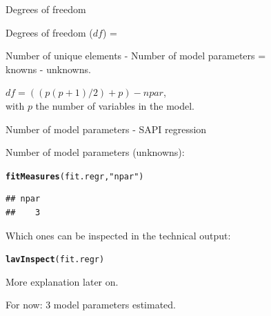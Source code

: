 \documentclass[10pt]{beamer}\usepackage[]{graphicx}\usepackage[]{xcolor}
\makeatletter
\newcommand{\hlstr}[1]{\textcolor[rgb]{0.192,0.494,0.8}{#1}}%
\newcommand{\hlstd}[1]{\textcolor[rgb]{0.345,0.345,0.345}{#1}}%
\newcommand{\hlkwd}[1]{\textcolor[rgb]{0.737,0.353,0.396}{\textbf{#1}}}%
\newenvironment{kframe}{%
 \def\at@end@of@kframe{}%
 \ifinner\ifhmode%
  \def\at@end@of@kframe{\end{minipage}}%
  \begin{minipage}{\columnwidth}%
 \fi\fi%
 \def\FrameCommand##1{\hskip\@totalleftmargin \hskip-\fboxsep
 \colorbox{shadecolor}{##1}\hskip-\fboxsep
     \hskip-\linewidth \hskip-\@totalleftmargin \hskip\columnwidth}%
 \MakeFramed {\advance\hsize-\width
   \@totalleftmargin\z@ \linewidth\hsize
   \@setminipage}}%
 {\par\unskip\endMakeFramed%
 \at@end@of@kframe}
\newenvironment{knitrout}{}{} %
\makeatother
\begin{document}
%
%
%
\begin{frame}[fragile]{Degrees of freedom}

Degrees of freedom ($df$) = 

\vspace{5mm}

Number of unique elements - Number of model parameters =\\
knowns - unknowns.


\vspace{5mm}

$df = ((p(p+1)/2) + p)         - npar$,\\
with $p$ the number of variables in the model.

\end{frame}
%
\begin{frame}[fragile]{Number of model parameters - SAPI regression}

Number of model parameters (unknowns):
\begin{knitrout}
\color{fgcolor}\begin{kframe}
\begin{alltt}
\hlkwd{fitMeasures}\hlstd{(fit.regr,} \hlstr{"npar"}\hlstd{)}
\end{alltt}
\begin{verbatim}
## npar 
##    3
\end{verbatim}
\end{kframe}
\end{knitrout}

\vspace{5mm}

Which ones can be inspected in the technical output:
\begin{knitrout}
\color{fgcolor}\begin{kframe}
\begin{alltt}
\hlkwd{lavInspect}\hlstd{(fit.regr)}
\end{alltt}
\end{kframe}
\end{knitrout}
More explanation later on.

\vspace{5mm}

For now: 3 model parameters estimated.

\end{frame}
\end{document}
